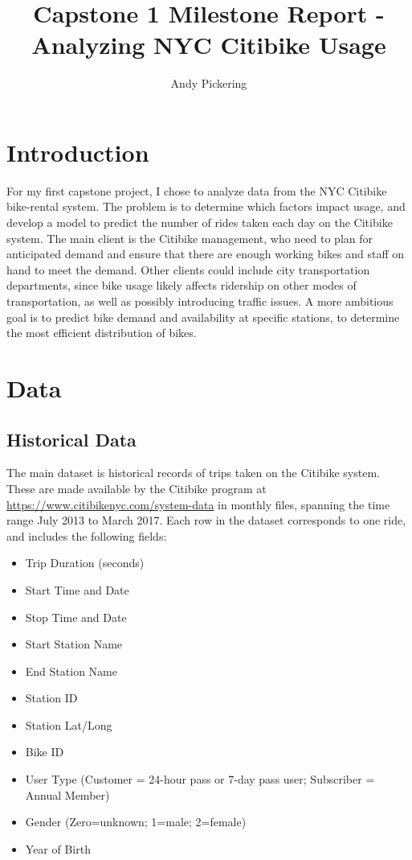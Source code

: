 \documentclass[11pt]{article}
\title{Capstone 1 Milestone Report - Analyzing NYC Citibike Usage}
\author{Andy Pickering}
\begin{document}
\maketitle

\tableofcontents
\newpage


\section{Introduction}

For my first capstone project, I chose to analyze data from the NYC Citibike bike-rental system.
The problem is to determine which factors impact usage, and develop a model to predict the number of rides taken each day on the Citibike system. The main client is the Citibike management, who need to plan for anticipated demand and ensure that there are enough working bikes and staff on hand to meet the demand. Other clients could include city transportation departments, since bike usage likely affects ridership on other modes of transportation, as well as possibly introducing traffic issues. A more ambitious goal is to predict bike demand and availability at specific stations, to determine the most efficient distribution of bikes. 




\section{Data}



\subsection{Historical Data}
The main dataset is historical records of trips taken on the Citibike system. These are made available by the Citibike program at \url{https://www.citibikenyc.com/system-data} in monthly files, spanning the time range July 2013 to March 2017. Each row in the dataset corresponds to one ride, and includes the following fields:

\begin{itemize}
\item Trip Duration (seconds)
\item Start Time and Date
\item Stop Time and Date
\item Start Station Name
\item End Station Name
\item Station ID
\item Station Lat/Long
\item Bike ID
\item User Type (Customer = 24-hour pass or 7-day pass user; Subscriber = Annual Member)
\item Gender (Zero=unknown; 1=male; 2=female)
\item Year of Birth
\end{itemize}
\end{document}
